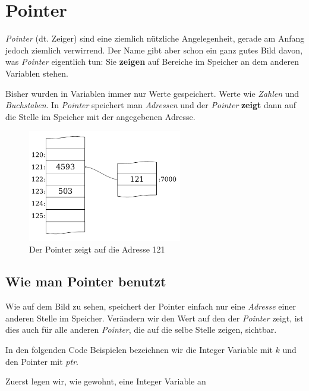\documentclass[c_worksheet.tex]{subfiles}
\begin{document}
	
\chapter{Pointer} 

\emph{Pointer} (dt. Zeiger) sind eine ziemlich nützliche Angelegenheit, gerade am Anfang jedoch ziemlich verwirrend. Der Name gibt aber schon ein ganz gutes Bild davon, was \emph{Pointer} eigentlich tun: Sie \textbf{zeigen} auf Bereiche im Speicher an dem anderen Variablen stehen.

Bisher wurden in Variablen immer nur Werte gespeichert. Werte wie \emph{Zahlen} und \emph{Buchstaben}. In \emph{Pointer} speichert man \emph{Adressen} und der \emph{Pointer} \textbf{zeigt} dann auf die Stelle im Speicher mit der angegebenen Adresse.

\begin{figure}[h]
\centering
\includegraphics[width=0.6\textwidth]{./Grafiken/Pointer/pointer_stack}
\caption{Der Pointer zeigt auf die Adresse 121} 
\end{figure}


\section{Wie man Pointer benutzt} 

Wie auf dem Bild zu sehen, speichert der Pointer einfach nur eine \emph{Adresse} einer anderen Stelle im Speicher. Verändern wir den Wert auf den der \emph{Pointer} zeigt, ist dies auch für alle anderen \emph{Pointer}, die auf die selbe Stelle zeigen, sichtbar.

In den folgenden Code Beispielen bezeichnen wir die Integer Variable mit \(k\) und den Pointer mit \emph{ptr}.

Zuerst legen wir, wie gewohnt, eine Integer Variable an


\end{document}
